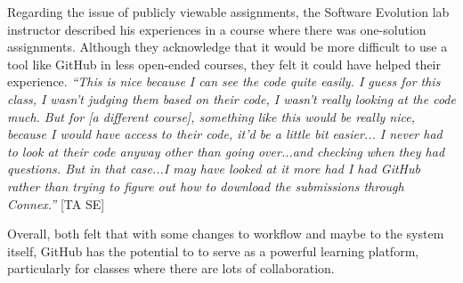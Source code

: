Regarding the issue of publicly viewable assignments, the Software Evolution lab instructor described his experiences in a course where there was one-solution assignments. Although they acknowledge that it would be more difficult to use a tool like GitHub in less open-ended courses, they felt it could have helped their experience. \textit{``This is nice because I can see the code quite easily. I guess for this class, I wasn't judging them based on their code, I wasn't really looking at the code much. But for [a different course], something like this would be really nice, because I would have access to their code, it'd be a little bit easier... I never had to look at their code anyway other than going over...and checking when they had questions. But in that case...I may have looked at it more had I had GitHub rather than trying to figure out how to download the submissions through Connex.''} [TA SE]

Overall, both felt that with some changes to workflow and maybe to the system itself, GitHub has the potential to to serve as a powerful learning platform, particularly for classes where there are lots of collaboration.







